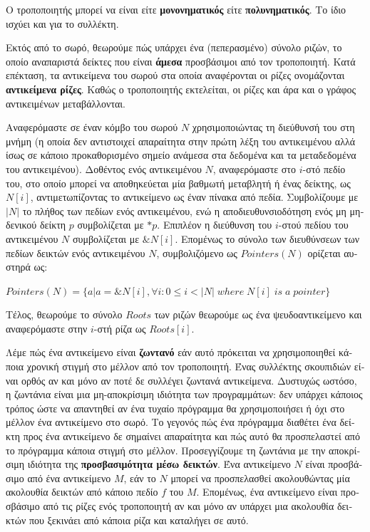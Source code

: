\begin{greek}
Ο τροποποιητής μπορεί να είναι είτε \textbf{μονονηματικός}
είτε \textbf{πολυνηματικός}. Το ίδιο ισχύει και για το συλλέκτη.

Εκτός από το σωρό, θεωρούμε πώς υπάρχει ένα (πεπερασμένο) σύνολο
ριζών, το οποίο αναπαριστά δείκτες που είναι \textbf{άμεσα}
προσβάσιμοι από τον τροποποιητή. Κατά επέκταση, τα αντικείμενα
του σωρού στα οποία αναφέρονται οι ρίζες ονομάζονται
\textbf{αντικείμενα ρίζες}. Καθώς ο τροποποιητής εκτελείται,
οι ρίζες και άρα και ο γράφος αντικειμένων μεταβάλλονται.

Αναφερόμαστε σε έναν κόμβο του σωρού $N$ χρησιμοποιώντας τη
διεύθυνσή του στη μνήμη (η οποία δεν αντιστοιχεί απαραίτητα
στην πρώτη λέξη του αντικειμένου αλλά ίσως σε κάποιο προκαθορισμένο
σημείο ανάμεσα στα δεδομένα και τα μεταδεδομένα του αντικειμένου).
Δοθέντος ενός αντικειμένου $N$, αναφερόμαστε στο $i$-στό πεδίο
του, στο οποίο μπορεί να αποθηκεύεται μία βαθμωτή μεταβλητή ή
ένας δείκτης, ως $N[i]$, αντιμετωπίζοντας το αντικείμενο ως
έναν πίνακα από πεδία. Συμβολίζουμε με $|N|$ το πλήθος των
πεδίων ενός αντικειμένου, ενώ η αποδιευθυνσιοδότηση ενός
μη μηδενικού δείκτη $p$ συμβολίζεται με $*p$. Επιπλέον η διεύθυνση
του $i$-στού πεδίου του αντικειμένου $N$ συμβολίζεται με
$\&N[i]$. Επομένως το σύνολο των διευθύνσεων των πεδίων δεικτών
ενός αντικειμένου $N$, συμβολιζόμενο ως $Pointers(N)$ ορίζεται
αυστηρά ως:

$Pointers(N)=\{a | a=\&N[i], \forall i: 0 \leq i < |N| \; where \; N[i] \; is \; a \; pointer\}$

Τέλος, θεωρούμε το σύνολο $Roots$ των ριζών θεωρούμε ως ένα
ψευδοαντικείμενο και αναφερόμαστε στην $i$-στή ρίζα ως $Roots[i]$.

Λέμε πώς ένα αντικείμενο είναι \textbf{ζωντανό} εάν αυτό πρόκειται
να χρησιμοποιηθεί κάποια χρονική στιγμή στο μέλλον από τον τροποποιητή.
Ένας συλλέκτης σκουπιδιών είναι ορθός αν και μόνο αν ποτέ δε
συλλέγει ζωντανά αντικείμενα. Δυστυχώς ωστόσο, η ζωντάνια είναι
μια μη-αποκρίσιμη ιδιότητα των προγραμμάτων: δεν υπάρχει κάποιος
τρόπος ώστε να απαντηθεί αν ένα τυχαίο πρόγραμμα θα χρησιμοποιήσει
ή όχι στο μέλλον ένα αντικείμενο στο σωρό. Το γεγονός πώς ένα
πρόγραμμα διαθέτει ένα δείκτη προς ένα αντικείμενο δε σημαίνει
απαραίτητα και πώς αυτό θα προσπελαστεί από το πρόγραμμα κάποια
στιγμή στο μέλλον. Προσεγγίζουμε τη ζωντάνια με την αποκρίσιμη
ιδιότητα της \textbf{προσβασιμότητα μέσω δεικτών}. Ένα αντικείμενο
$N$ είναι προσβάσιμο από ένα αντικείμενο $M$, εάν το $N$ μπορεί
να προσπελασθεί ακολουθώντας μία ακολουθία δεικτών από κάποιο
πεδίο $f$ του $M$. Επομένως, ένα αντικείμενο είναι προσβάσιμο
από τις ρίζες ενός τροποποιητή αν και μόνο αν υπάρχει μια ακολουθία
δεικτών που ξεκινάει από κάποια ρίζα και καταλήγει σε αυτό.


\end{greek}
